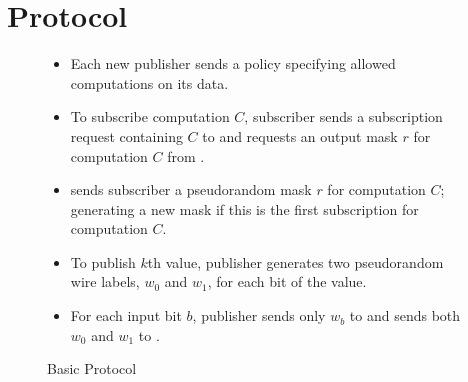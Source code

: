 \section{Protocol}
\label{sec:protocol}

\begin{figure}[h]
	\caption{Basic Protocol}
\label{fig:basicprotocol}
\begin{mdframed}[style=myframe]


\initialize
\begin{itemize}[leftmargin=*]
 
	\item Each new publisher sends \broker a policy specifying allowed
		computations on its data.


\end{itemize}

\subscribe
\begin{itemize}[leftmargin=*]

	\item To subscribe computation $C$, subscriber sends a subscription request
		containing $C$ to \broker and requests an output mask $r$ for computation
		$C$ from \garbler.

	\item \garbler sends subscriber a pseudorandom mask $r$ for computation $C$;
		generating a new mask if this is the first subscription for computation
		$C$.

\end{itemize}

\publish
\begin{itemize}[leftmargin=*]
		
	\item To publish $k$th value, publisher generates two pseudorandom wire
		labels, $w_0$ and $w_1$, for each bit of the value. 
		
	\item For each input bit $b$, publisher sends only $w_b$ to \broker and sends
		both $w_0$ and $w_1$ to \garbler.

\end{itemize}


\end{mdframed}
\end{figure}
